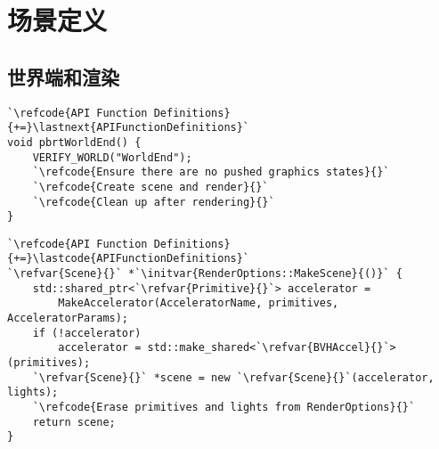 \section{场景定义}\label{sec:场景定义}

\subsection{世界端和渲染}\label{sub:世界端和渲染}
\begin{lstlisting}
`\refcode{API Function Definitions}{+=}\lastnext{APIFunctionDefinitions}`
void pbrtWorldEnd() {
    VERIFY_WORLD("WorldEnd");
    `\refcode{Ensure there are no pushed graphics states}{}`
    `\refcode{Create scene and render}{}`
    `\refcode{Clean up after rendering}{}`
}
\end{lstlisting}

\begin{lstlisting}
`\refcode{API Function Definitions}{+=}\lastcode{APIFunctionDefinitions}`
`\refvar{Scene}{}` *`\initvar{RenderOptions::MakeScene}{()}` {
    std::shared_ptr<`\refvar{Primitive}{}`> accelerator =
        MakeAccelerator(AcceleratorName, primitives, AcceleratorParams);
    if (!accelerator)
        accelerator = std::make_shared<`\refvar{BVHAccel}{}`>(primitives);
    `\refvar{Scene}{}` *scene = new `\refvar{Scene}{}`(accelerator, lights);
    `\refcode{Erase primitives and lights from RenderOptions}{}`
    return scene;
}
\end{lstlisting}
